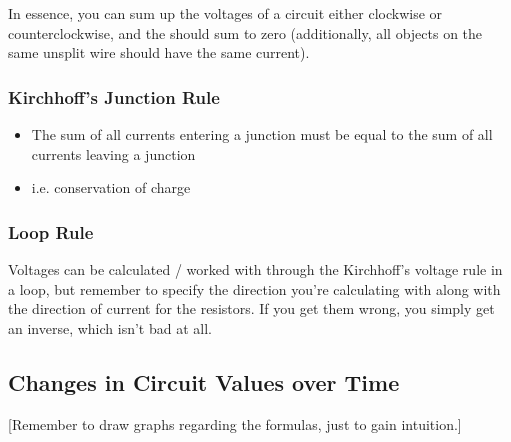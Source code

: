 \documentclass{article}
\begin{document}
In essence, you can sum up the voltages of a circuit either clockwise or counterclockwise, and the should sum to zero (additionally, all objects on the same unsplit wire should have the same current).

\subsubsection{Kirchhoff's Junction Rule}

\begin{itemize}
    \item The sum of all currents entering a junction must be equal to the sum of all currents leaving a junction
    \item i.e. conservation of charge
\end{itemize}

\subsubsection{Loop Rule}

Voltages can be calculated / worked with through the Kirchhoff's voltage rule in a loop, but remember to specify the direction you're calculating with along with the direction of current for the resistors. If you get them wrong, you simply get an inverse, which isn't bad at all.

\subsection{Changes in Circuit Values over Time}

[Remember to draw graphs regarding the formulas, just to gain intuition.]
\end{document}
